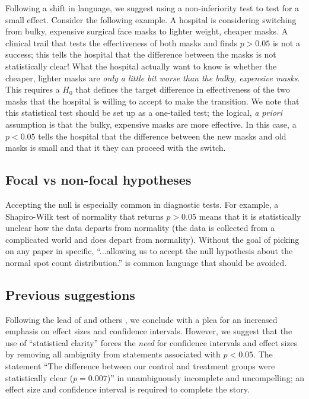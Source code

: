 Following a shift in language, we suggest using a non-inferiority test to test for a small effect. Consider the following 
example. A hospital is considering switching from bulky, expensive surgical face masks to lighter weight, cheaper masks. A
clinical trail that tests the effectiveness of both masks and finds $p > 0.05$ is not a success; this tells the hospital 
that the difference between the masks is not statistically clear! What the hospital actually want to know is whether the 
cheaper, lighter masks are \emph{only a little bit worse than the bulky, expensive masks}. This requires a $H_{0}$ that 
defines the target difference in effectiveness of the two masks that the hospital is willing to accept to make the 
transition. We note that this statistical test should be set up as a one-tailed test; the logical, \emph{a priori} 
assumption is that the bulky, expensive masks are more effective. In this case, a $p < 0.05$ tells the hospital that the 
difference between the new masks and old masks is small and that it they can proceed with the switch.

\subsection*{Focal vs non-focal hypotheses}

Accepting the null is especially common in diagnostic tests. For example, a Shapiro-Wilk test of normality that
returns $p > 0.05$ means that it is statistically unclear how the data departs from normality (the data is collected
from a complicated world and does depart from normality). Without the goal of picking on any paper in specific, 
``...allowing us to accept the null hypothesis about the normal spot count distribution.'' \citep{Karulinetal.2015} 
is common language that should be avoided.

\subsection*{Previous suggestions}

Following the lead of \citet{Cohen1994} and others \citep{Goodman1999, ZiliakandMcCloskey2008, WassersteinandLazar2016},
we conclude with a plea for an increased emphasis on effect sizes and confidence intervals. However, we suggest that the
use of ``statistical clarity'' forces the \emph{need} for confidence intervals and effect sizes by removing all ambiguity
from statements associated with $p < 0.05$. The statement ``The difference between our control and treatment groups were
statistically clear ($p = 0.007$)'' in unambiguously incomplete and uncompelling; an effect size and confidence interval 
is required to complete the story.

